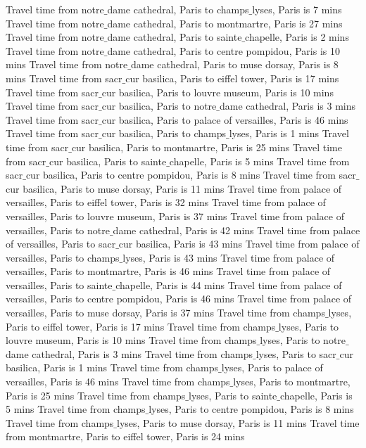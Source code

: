 \documentclass[doubleblind]{ecai}
\begin{document}
{Travel time from notre$\_$dame cathedral, Paris to champs$\_$lyses, Paris is 7 mins
Travel time from notre$\_$dame cathedral, Paris to montmartre, Paris is 27 mins
Travel time from notre$\_$dame cathedral, Paris to sainte$\_$chapelle, Paris is 2 mins
Travel time from notre$\_$dame cathedral, Paris to centre pompidou, Paris is 10 mins
Travel time from notre$\_$dame cathedral, Paris to muse dorsay, Paris is 8 mins
Travel time from sacr$\_$cur basilica, Paris to eiffel tower, Paris is 17 mins
Travel time from sacr$\_$cur basilica, Paris to louvre museum, Paris is 10 mins
Travel time from sacr$\_$cur basilica, Paris to notre$\_$dame cathedral, Paris is 3 mins
Travel time from sacr$\_$cur basilica, Paris to palace of versailles, Paris is 46 mins
Travel time from sacr$\_$cur basilica, Paris to champs$\_$lyses, Paris is 1 mins
Travel time from sacr$\_$cur basilica, Paris to montmartre, Paris is 25 mins
Travel time from sacr$\_$cur basilica, Paris to sainte$\_$chapelle, Paris is 5 mins
Travel time from sacr$\_$cur basilica, Paris to centre pompidou, Paris is 8 mins
Travel time from sacr$\_$cur basilica, Paris to muse dorsay, Paris is 11 mins
Travel time from palace of versailles, Paris to eiffel tower, Paris is 32 mins
Travel time from palace of versailles, Paris to louvre museum, Paris is 37 mins
Travel time from palace of versailles, Paris to notre$\_$dame cathedral, Paris is 42 mins
Travel time from palace of versailles, Paris to sacr$\_$cur basilica, Paris is 43 mins
Travel time from palace of versailles, Paris to champs$\_$lyses, Paris is 43 mins
Travel time from palace of versailles, Paris to montmartre, Paris is 46 mins
Travel time from palace of versailles, Paris to sainte$\_$chapelle, Paris is 44 mins
Travel time from palace of versailles, Paris to centre pompidou, Paris is 46 mins
Travel time from palace of versailles, Paris to muse dorsay, Paris is 37 mins
Travel time from champs$\_$lyses, Paris to eiffel tower, Paris is 17 mins
Travel time from champs$\_$lyses, Paris to louvre museum, Paris is 10 mins
Travel time from champs$\_$lyses, Paris to notre$\_$dame cathedral, Paris is 3 mins
Travel time from champs$\_$lyses, Paris to sacr$\_$cur basilica, Paris is 1 mins
Travel time from champs$\_$lyses, Paris to palace of versailles, Paris is 46 mins
Travel time from champs$\_$lyses, Paris to montmartre, Paris is 25 mins
Travel time from champs$\_$lyses, Paris to sainte$\_$chapelle, Paris is 5 mins
Travel time from champs$\_$lyses, Paris to centre pompidou, Paris is 8 mins
Travel time from champs$\_$lyses, Paris to muse dorsay, Paris is 11 mins
Travel time from montmartre, Paris to eiffel tower, Paris is 24 mins
}
\end{document}
